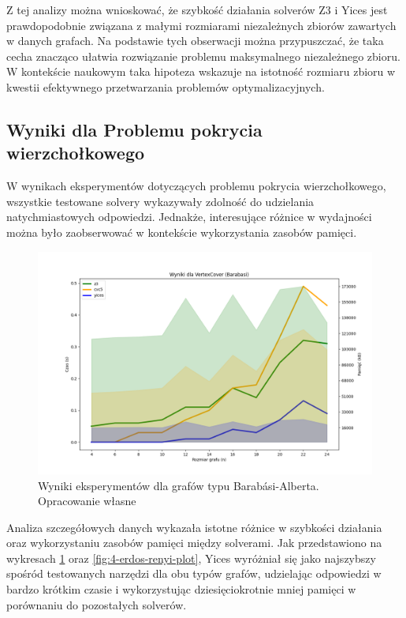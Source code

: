 Z tej analizy można wnioskować, że szybkość działania solverów Z3 i Yices jest prawdopodobnie związana z małymi rozmiarami niezależnych zbiorów zawartych w danych grafach. Na podstawie tych obserwacji można przypuszczać, że taka cecha znacząco ułatwia rozwiązanie problemu maksymalnego niezależnego zbioru. W kontekście naukowym taka hipoteza wskazuje na istotność rozmiaru zbioru w kwestii efektywnego przetwarzania problemów optymalizacyjnych.


\subsection{Wyniki dla Problemu pokrycia wierzchołkowego}

W wynikach eksperymentów dotyczących problemu pokrycia wierzchołkowego, wszystkie testowane solvery wykazywały zdolność do udzielania natychmiastowych odpowiedzi. Jednakże, interesujące różnice w wydajności można było zaobserwować w kontekście wykorzystania zasobów pamięci.

\begin{figure}[htbp]
	\centering
	\begin{minipage}{\textwidth}
		\includegraphics[width=\textwidth]{./figures/5-barabasi-plot.png}
		\caption{Wyniki eksperymentów dla grafów typu Barabási-Alberta. Opracowanie własne}
		\label{fig:5-barabasi-plot}
	\end{minipage}
\end{figure}

Analiza szczegółowych danych wykazała istotne różnice w szybkości działania oraz wykorzystaniu zasobów pamięci między solverami. Jak przedstawiono na wykresach \ref{fig:5-barabasi-plot} oraz \ref{fig:4-erdos-renyi-plot}, Yices wyróżniał się jako najszybszy spośród testowanych narzędzi dla obu typów grafów, udzielając odpowiedzi w bardzo krótkim czasie i wykorzystując dziesięciokrotnie mniej pamięci w porównaniu do pozostałych solverów.

